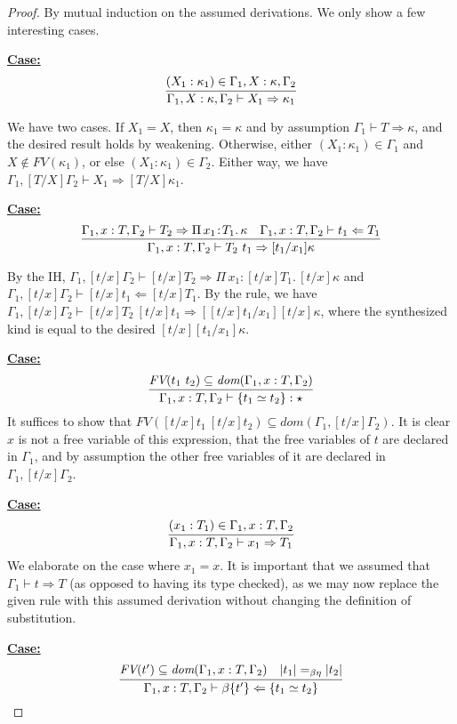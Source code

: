 \documentclass{article}
\newcommand{\abs}[4]{{#1}\, #2\! : \! #3.\, #4}
\newcommand{\tpcheck}[0]{\Leftarrow}
\newcommand{\tpsynth}[0]{\Rightarrow}
\newcommand{\startcase}[1]{\vspace{#1} \noindent\textbf{\underline{Case:}}}
\begin{document}
\begin{proof}
  By mutual induction on the assumed derivations.
  We only show a few interesting cases.
  
  \startcase{.2cm}
  \[
    \infer{\Gamma_1,X:\kappa,\Gamma_2 \vdash X_1 \tpsynth \kappa_1}{(X_1 : \kappa_1) \in \Gamma_1,X:\kappa,\Gamma_2}
  \]

  We have two cases.
  If \(X_1 = X\), then \(\kappa_1 = \kappa\) and by assumption \(\Gamma_1 \vdash
  T \tpsynth \kappa\), and the desired result holds by weakening.
  Otherwise, either \((X_1 : \kappa_1) \in \Gamma_1\) and \(X \notin
  \textit{FV}(\kappa_1)\), or else \((X_1 : \kappa_1) \in \Gamma_2\).
  Either way, we have \(\Gamma_1,[T/X]\Gamma_2 \vdash X_1 \tpsynth
  [T/X]\kappa_1\).

  \startcase{.2cm}
  \[ \infer{\Gamma_1,x:T,\Gamma_2\vdash T_2\ t_1 \tpsynth [t_1/x_1]\kappa
    }{
      \Gamma_1,x:T,\Gamma_2\vdash T_2 \tpsynth \abs{\Pi}{x_1}{T_1}{\kappa}
      & \Gamma_1,x:T,\Gamma_2\vdash t_1 \tpcheck T_1
    }
  \]

  By the IH, \(\Gamma_1,[t/x]\Gamma_2 \vdash [t/x]T_2 \tpsynth
  \abs{\Pi}{x_1}{[t/x]T_1}{[t/x]\kappa}\) and \(\Gamma_1,[t/x]\Gamma_2 \vdash
  [t/x]t_1 \tpcheck [t/x]T_1\).
  By the rule, we have \(\Gamma_1,[t/x]\Gamma_2 \vdash [t/x]T_2\ [t/x]t_1
  \tpsynth [[t/x]t_1/x_1][t/x]\kappa\), where the synthesized kind is equal to
  the desired \([t/x][t_1/x_1]\kappa\).

  \startcase{.2cm}
  \[
    \infer{
      \Gamma_1,x:T,\Gamma_2\vdash \{ t_1 \simeq t_2 \} : \star
    }{
      \textit{FV}(t_1\ t_2)\subseteq\textit{dom}(\Gamma_1,x:T,\Gamma_2)
    }
  \]
  It suffices to show that \(\textit{FV}([t/x]t_1\ [t/x]t_2) \subseteq
  \textit{dom}(\Gamma_1,[t/x]\Gamma_2)\).
  It is clear \(x\) is not a free variable of this expression, that the free
  variables of \(t\) are declared in \(\Gamma_1\), and by assumption the other
  free variables of it are declared in \(\Gamma_1,[t/x]\Gamma_2\).

  \startcase{.2cm}
  \[
    \infer{\Gamma_1,x:T,\Gamma_2 \vdash x_1\tpsynth T_1}{(x_1 : T_1) \in \Gamma_1,x:T,\Gamma_2}
  \]
  We elaborate on the case where \(x_1 = x\).
  It is important that we assumed that \(\Gamma_1 \vdash t \tpsynth T\) (as
  opposed to having its type checked), as we may now replace the given rule with
  this assumed derivation without changing the definition of substitution.

  \startcase{.2cm}
  \[
    \infer{\Gamma_1,x:T,\Gamma_2\vdash \beta\{t'\} \tpcheck \{ t_1 \simeq t_2 \}}
    {\textit{FV}(t')\subseteq \textit{dom}(\Gamma_1,x:T,\Gamma_2) \quad |t_1| =_{\beta\eta} |t_2|}
  \]


\end{proof}
\end{document}
